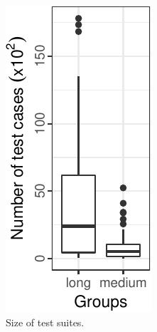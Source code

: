 \begin{figure}[t]
  \centering
  \begin{subfigure}{0.15\textwidth}
    \centering
    \includegraphics[width=.85\textwidth]{results/boxplots-testcases.pdf}
    \caption{\label{fig:size-testsuites}Size of test suites.}
  \end{subfigure}
  ~
  \begin{subfigure}{0.3\textwidth}
    \centering

\end{subfigure}
\end{figure}
